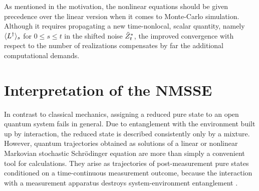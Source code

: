 As mentioned in the motivation, the nonlinear equations should be given precedence over the linear version when it comes to Monte-Carlo simulation.
Although it requires propagating a new time-nonlocal, scalar quantity, namely $\langle L^\dagger \rangle_s$ for $0 \le s \le t$ in the shifted noise ${\tilde Z}^*_t$, the improved convergence with respect to the number of realizations compensates by far the additional computational demands.

\section{Interpretation of the NMSSE}
\label{sec:nmqsd.interpretation}
%


In contrast to classical mechanics, assigning a reduced pure state to an open quantum system fails in general.
Due to entanglement with the environment built up by interaction, the reduced state is described consistently only by a mixture.
However, quantum trajectories obtained as solutions of a linear or nonlinear Markovian stochastic Schrödinger equation are more than simply a convenient tool for calculations.
They arise as trajectories of post-measurement pure states conditioned on a time-continuous measurement outcome, because the interaction with a measurement apparatus destroys system-environment entanglement \cite{Ca93_quantum_optics,BaGr09_trajectories}.

